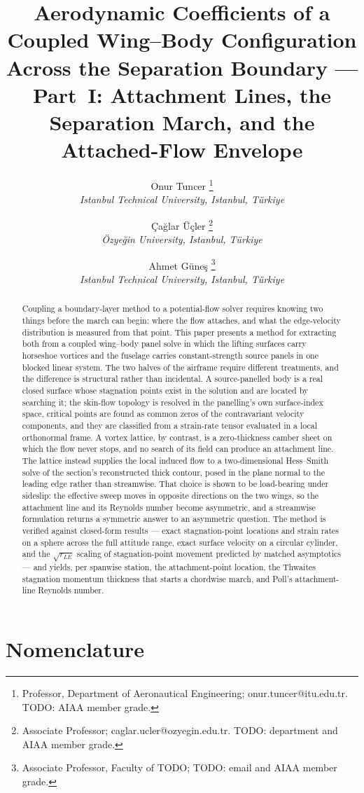 \documentclass[submit]{aiaa-tc}%
\title{Aerodynamic Coefficients of a Coupled Wing--Body Configuration
       Across the Separation Boundary --- Part~I: Attachment Lines, the
       Separation March, and the Attached-Flow Envelope}
\author{
 Onur Tuncer%
  \thanks{Professor, Department of Aeronautical Engineering;
    onur.tuncer@itu.edu.tr. TODO: AIAA member grade.}\\
 {\normalsize\itshape
  Istanbul Technical University, Istanbul, T\"urkiye}
 \and
 \c{C}a\u{g}lar \"U\c{c}ler%
  \thanks{Associate Professor; caglar.ucler@ozyegin.edu.tr.
    TODO: department and AIAA member grade.}\\
 {\normalsize\itshape
  \"Ozye\u{g}in University, Istanbul, T\"urkiye}
 \and
 Ahmet G\"une\c{s}%
  \thanks{Associate Professor, Faculty of TODO; TODO: email and AIAA
    member grade.}\\
 {\normalsize\itshape
  Istanbul Technical University, Istanbul, T\"urkiye}
}
\begin{document}
\maketitle

\begin{abstract}
Coupling a boundary-layer method to a potential-flow solver requires
knowing two things before the march can begin: where the flow attaches,
and what the edge-velocity distribution is measured from that point. This
paper presents a method for extracting both from a coupled wing--body
panel solve in which the lifting surfaces carry horseshoe vortices and the
fuselage carries constant-strength source panels in one blocked linear
system. The two halves of the airframe require different treatments, and
the difference is structural rather than incidental. A source-panelled
body is a real closed surface whose stagnation points exist in the
solution and are located by searching it; the skin-flow topology is
resolved in the panelling's own surface-index space, critical points are
found as common zeros of the contravariant velocity components, and they
are classified from a strain-rate tensor evaluated in a local orthonormal
frame. A vortex lattice, by contrast, is a zero-thickness camber sheet on
which the flow never stops, and no search of its field can produce an
attachment line. The lattice instead supplies the local induced flow to a
two-dimensional Hess--Smith solve of the section's reconstructed thick
contour, posed in the plane normal to the leading edge rather than
streamwise. That choice is shown to be load-bearing under sideslip: the
effective sweep moves in opposite directions on the two wings, so the
attachment line and its Reynolds number become asymmetric, and a
streamwise formulation returns a symmetric answer to an asymmetric
question. The method is verified against closed-form results --- exact
stagnation-point locations and strain rates on a sphere across the full
attitude range, exact surface velocity on a circular cylinder, and the
$\sqrt{r_{LE}}$ scaling of stagnation-point movement predicted by matched
asymptotics --- and yields, per spanwise station, the attachment-point
location, the Thwaites stagnation momentum thickness that starts a
chordwise march, and Poll's attachment-line Reynolds number.
\end{abstract}

\section*{Nomenclature}
\end{document}
